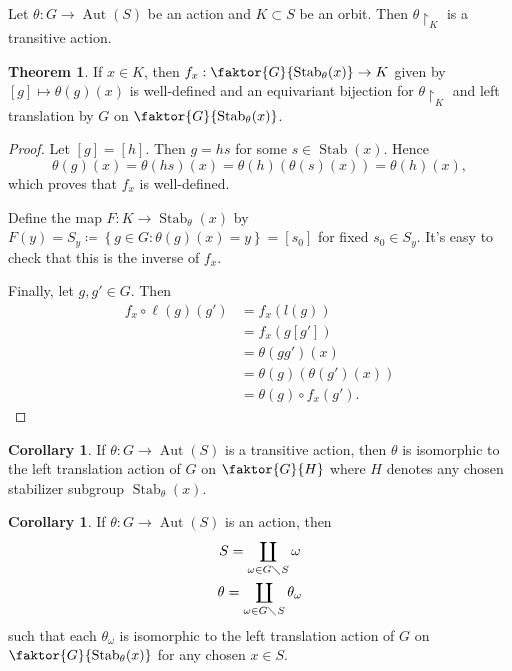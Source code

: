 \documentclass[10pt,letterpaper,cm]{nupset}
\theoremstyle{definition}
\theoremstyle{theorem}
\newtheorem{theorem}[definition]{Theorem}
\newtheorem{corollary}[definition]{Corollary}
\theoremstyle{remark}
\newcommand{\1}{\mathbf{1}}
\newcommand{\0}{\vec 0}
\DeclareMathOperator{\aut}{Aut}
\DeclareMathOperator{\stab}{Stab}
\begin{document}
\smallskip

Let $ \theta: G \to \aut(S)$ be an action and $K \subset S$ be an orbit. Then $\theta \restriction_K$ is a transitive action. 

\begin{theorem}
If $x \in K$, then $f_x: \faktor{G}{\stab_\theta(x)} \to K$ given by $[g] \mapsto \theta(g)(x)$ is well-defined and an equivariant bijection for $\theta \restriction_K$ and left translation by $G$ on $\faktor{G}{\stab_\theta(x)}$.
\end{theorem}

\begin{proof}
Let $[g] = [h]$. Then $g = hs$ for some $s \in \stab(x)$. Hence $$\theta(g)(x) = \theta(hs)(x) = \theta(h)(\theta(s)(x)) = \theta(h)(x),$$ which proves that $f_x$ is well-defined.

Define the map $F: K \to \stab_\theta(x)$ by $F(y) = S_y \coloneqq  \left\{g \in G : \theta(g)(x) = y\right\} = \left[s_0\right]$ for fixed $s_0 \in S_y$.
It's easy to check that this is the inverse of $f_x$. 

Finally, let $g, g'\in G$. Then 
\begin{align*} f_x \circ \ell(g)(g') & = f_x(l(g)) \\ & = f_x(g[g'])  \\ & = \theta(gg')(x) 
 \\ & = \theta(g)(\theta(g')(x))\\ &  = \theta(g) \circ f_x(g').
\end{align*}
\end{proof}

\begin{corollary}
If $\theta : G \to \aut(S)$ is a transitive action, then $\theta$ is isomorphic to the left translation action of $G$ on $\faktor{G}{H}$ where $H$ denotes any chosen stabilizer subgroup $ \stab_{\theta}(x)$.
\end{corollary}

\begin{corollary}
If $\theta : G \to \aut(S)$ is an action, then 
\begin{gather*}
S = \coprod_{\omega \in G\diagdown S}\omega
\\ \theta = \coprod_{\omega \in G \diagdown S} \theta_{\omega}
\end{gather*}
such that each $\theta_{\omega}$ is isomorphic to the left translation action of $G$ on $\faktor{G}{\stab_{\theta}(x)}$ for any chosen $x\in S$. 
\end{corollary}
\end{document}
